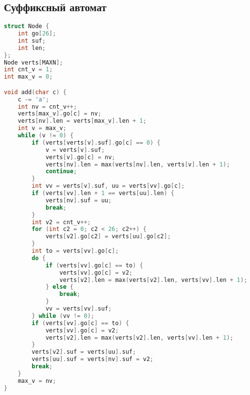\documentclass[10pt,a4paper,landscape,twosided]{extarticle}
\begin{document}
\begin{multicols*}{3}
\begin{lstlisting}[language=C++]
\end{lstlisting}

\subsection{Суффиксный автомат}
\begin{lstlisting}[language=C++]
struct Node {
    int go[26];
    int suf;
    int len;
};
Node verts[MAXN];
int cnt_v = 1;
int max_v = 0;

void add(char c) {
    c -= 'a';
    int nv = cnt_v++;
    verts[max_v].go[c] = nv;
    verts[nv].len = verts[max_v].len + 1;
    int v = max_v;
    while (v != 0) {
        if (verts[verts[v].suf].go[c] == 0) {
            v = verts[v].suf;
            verts[v].go[c] = nv;
            verts[nv].len = max(verts[nv].len, verts[v].len + 1);
            continue;
        }
        int vv = verts[v].suf, uu = verts[vv].go[c];
        if (verts[vv].len + 1 == verts[uu].len) {
            verts[nv].suf = uu;
            break;
        }
        int v2 = cnt_v++;
        for (int c2 = 0; c2 < 26; c2++) {
            verts[v2].go[c2] = verts[uu].go[c2];
        }
        int to = verts[vv].go[c];
        do {
            if (verts[vv].go[c] == to) {
                verts[vv].go[c] = v2;
                verts[v2].len = max(verts[v2].len, verts[vv].len + 1);
            } else {
                break;
            }
            vv = verts[vv].suf;
        } while (vv != 0);
        if (verts[vv].go[c] == to) {
            verts[vv].go[c] = v2;
            verts[v2].len = max(verts[v2].len, verts[vv].len + 1);
        }
        verts[v2].suf = verts[uu].suf;
        verts[uu].suf = verts[nv].suf = v2;
        break;
    }
    max_v = nv;
}


\end{lstlisting}


\end{multicols*}
\end{document}
